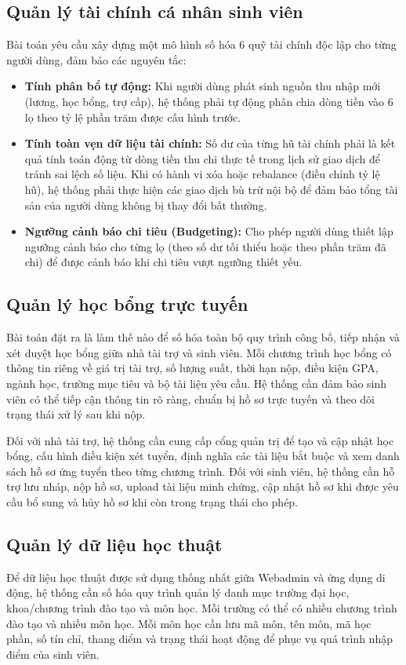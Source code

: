 \subsection{Quản lý tài chính cá nhân sinh viên}
Bài toán yêu cầu xây dựng một mô hình số hóa 6 quỹ tài chính độc lập cho từng người dùng, đảm bảo các nguyên tắc:
\begin{itemize}
    \item \textbf{Tính phân bổ tự động:} Khi người dùng phát sinh nguồn thu nhập mới (lương, học bổng, trợ cấp), hệ thống phải tự động phân chia dòng tiền vào 6 lọ theo tỷ lệ phần trăm được cấu hình trước.
    \item \textbf{Tính toàn vẹn dữ liệu tài chính:} Số dư của từng hũ tài chính phải là kết quả tính toán động từ dòng tiền thu chi thực tế trong lịch sử giao dịch để tránh sai lệch số liệu. Khi có hành vi xóa hoặc rebalance (điều chỉnh tỷ lệ hũ), hệ thống phải thực hiện các giao dịch bù trừ nội bộ để đảm bảo tổng tài sản của người dùng không bị thay đổi bất thường.
    \item \textbf{Ngưỡng cảnh báo chi tiêu (Budgeting):} Cho phép người dùng thiết lập ngưỡng cảnh báo cho từng lọ (theo số dư tối thiểu hoặc theo phần trăm đã chi) để được cảnh báo khi chi tiêu vượt ngưỡng thiết yếu.
\end{itemize}

\subsection{Quản lý học bổng trực tuyến}
Bài toán đặt ra là làm thế nào để số hóa toàn bộ quy trình công bố, tiếp nhận và xét duyệt học bổng giữa nhà tài trợ và sinh viên. Mỗi chương trình học bổng có thông tin riêng về giá trị tài trợ, số lượng suất, thời hạn nộp, điều kiện GPA, ngành học, trường mục tiêu và bộ tài liệu yêu cầu. Hệ thống cần đảm bảo sinh viên có thể tiếp cận thông tin rõ ràng, chuẩn bị hồ sơ trực tuyến và theo dõi trạng thái xử lý sau khi nộp.

Đối với nhà tài trợ, hệ thống cần cung cấp cổng quản trị để tạo và cập nhật học bổng, cấu hình điều kiện xét tuyển, định nghĩa các tài liệu bắt buộc và xem danh sách hồ sơ ứng tuyển theo từng chương trình. Đối với sinh viên, hệ thống cần hỗ trợ lưu nháp, nộp hồ sơ, upload tài liệu minh chứng, cập nhật hồ sơ khi được yêu cầu bổ sung và hủy hồ sơ khi còn trong trạng thái cho phép.

\subsection{Quản lý dữ liệu học thuật}
Để dữ liệu học thuật được sử dụng thống nhất giữa Webadmin và ứng dụng di động, hệ thống cần số hóa quy trình quản lý danh mục trường đại học, khoa/chương trình đào tạo và môn học. Mỗi trường có thể có nhiều chương trình đào tạo và nhiều môn học. Mỗi môn học cần lưu mã môn, tên môn, mã học phần, số tín chỉ, thang điểm và trạng thái hoạt động để phục vụ quá trình nhập điểm của sinh viên.

